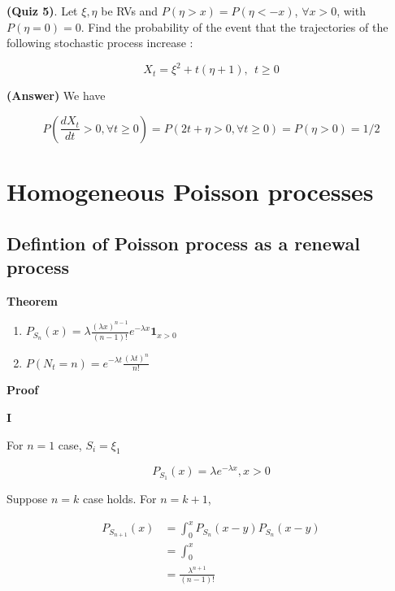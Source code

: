 \documentclass[12pt]{article}
\theoremstyle{nonumberbreak}
\begin{document}
\textbf{(Quiz 5)}. Let $\xi, \eta$ be RVs and $P(\eta > x) = P (\eta < -x)$, $\forall x >0$, with $P(\eta=0) = 0$. Find the probability of the event that the trajectories of the following stochastic process increase :

$$
X_t = \xi^2 + t(\eta + 1), \ \ t \ge 0
$$

\textbf{(Answer)} We have

$$
P(\frac{d X_t}{dt} > 0,\forall t\ge0) = P(2t + \eta > 0,\forall t\ge0) = P(\eta >0) = 1/2
$$











\pagebreak
\section{Homogeneous Poisson processes}


\subsection{Defintion of Poisson process as a renewal process}


\begin{theorem}
\textbf{Theorem}
\begin{enumerate}[label=(\roman*)]
	\item $P_{S_n} (x) = \lambda \frac{(\lambda x)^{n-1}}{(n-1)!} e^{-\lambda x} \mathbf{1}_{x>0}$
	\item $P(N_t = n) = e^{-\lambda t} \frac{(\lambda t)^n}{n!}$
\end{enumerate}
\end{theorem}

\textbf{Proof} 

\textbf{I}

For $n=1$ case, $S_i = \xi_1$

$$
P_{S_1} (x) = \lambda e^{-\lambda x}, x>0
$$

Suppose $n=k$ case holds. For $n=k+1$, 

$$
\begin{aligned}
P_{S_{n+1}}(x) &= \int_0^x P_{S_n} ( x-y)  P_{S_n} ( x-y) \\[8pt]
&= \int_0^x \frac{}{} \\[8pt]
&= \frac{\lambda^{n+1}}{(n-1)!} 
\end{aligned}
$$
\end{document}
